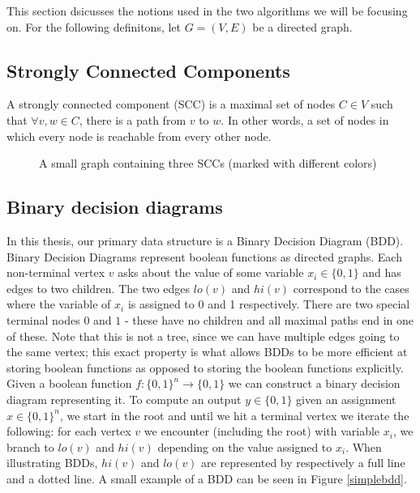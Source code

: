 \documentclass[../master/master.tex]{subfiles}
\begin{document}
This section dsicusses the notions used in the two algorithms we will be focusing on. For the following definitons, let $G=(V,E)$ be a directed graph.

\subsection{Strongly Connected Components}
A strongly connected component (SCC) is a maximal set of nodes $C\in V$ such that $\forall v,w\in C$, there is a path from $v$ to $w$. In other words, a set of nodes in which every node is reachable from every other node.
\begin{figure}[H]
\center
{}
\caption{A small graph containing three SCCs (marked with different colors)}
\end{figure}

\subsection{Binary decision diagrams}
In this thesis, our primary data structure is a Binary Decision Diagram (BDD). Binary Decision Diagrams represent boolean functions as directed graphs. Each non-terminal vertex $v$ asks about the value of some variable $x_i\in \{0,1\}$ and has edges to two children. The two edges $lo(v)$ and $hi(v)$ correspond to the cases where the variable of $x_i$ is assigned to 0 and 1 respectively. There are two special terminal nodes $0$ and $1$ - these have no children and all maximal paths end in one of these. Note that this is not a tree, since we can have multiple edges going to the same vertex; this exact property is what allows BDDs to be more efficient at storing boolean functions as opposed to storing the boolean functions explicitly.
Given a boolean function $f: \{0,1\}^n \rightarrow \{0,1\}$ we can construct a binary decision diagram representing it. To compute an output $y\in \{0,1\}$ given an assignment  $x\in\{0,1\}^n$, we start in the root and until we hit a terminal vertex we iterate the following: for each vertex $v$ we encounter (including the root) with variable $x_i$, we branch to $lo(v)$ and $hi(v)$ depending on the value assigned to $x_i$. When illustrating BDDs, $hi(v)$ and $lo(v)$ are represented by respectively a full line and a dotted line. A small example of a BDD can be seen in Figure \ref{simplebdd}.
\end{document}
